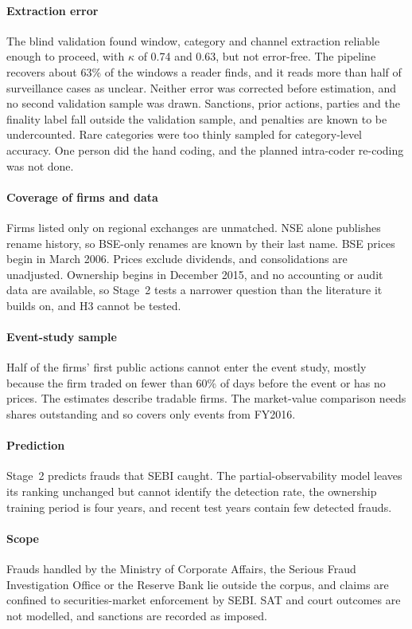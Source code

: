 \documentclass[letterpaper,11pt,leqno]{article}
\begin{document}
\paragraph{Extraction error} The blind validation found window, category and channel extraction reliable enough to proceed, with $\kappa$ of 0.74 and 0.63, but not error-free. The pipeline recovers about 63\% of the windows a reader finds, and it reads more than half of surveillance cases as unclear. Neither error was corrected before estimation, and no second validation sample was drawn. Sanctions, prior actions, parties and the finality label fall outside the validation sample, and penalties are known to be undercounted. Rare categories were too thinly sampled for category-level accuracy. One person did the hand coding, and the planned intra-coder re-coding was not done.

\paragraph{Coverage of firms and data} Firms listed only on regional exchanges are unmatched. NSE alone publishes rename history, so BSE-only renames are known by their last name. BSE prices begin in March 2006. Prices exclude dividends, and consolidations are unadjusted. Ownership begins in December 2015, and no accounting or audit data are available, so Stage~2 tests a narrower question than the literature it builds on, and H3 cannot be tested.

\paragraph{Event-study sample} Half of the firms' first public actions cannot enter the event study, mostly because the firm traded on fewer than 60\% of days before the event or has no prices. The estimates describe tradable firms. The market-value comparison needs shares outstanding and so covers only events from FY2016.

\paragraph{Prediction} Stage~2 predicts frauds that SEBI caught. The partial-observability model leaves its ranking unchanged but cannot identify the detection rate, the ownership training period is four years, and recent test years contain few detected frauds.

\paragraph{Scope} Frauds handled by the Ministry of Corporate Affairs, the Serious Fraud Investigation Office or the Reserve Bank lie outside the corpus, and claims are confined to securities-market enforcement by SEBI. SAT and court outcomes are not modelled, and sanctions are recorded as imposed.
\end{document}
